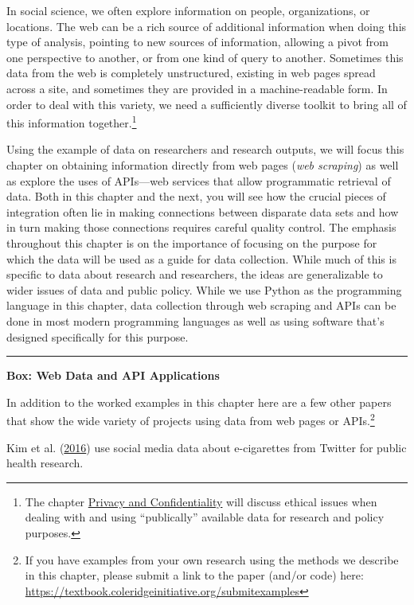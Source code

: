 \documentclass[]{krantz}
\begin{document}
In social science, we often explore information on people,
organizations, or locations. The web can be a rich source of additional
information when doing this type of analysis, pointing to new sources of
information, allowing a pivot from one perspective to another, or from
one kind of query to another. Sometimes this data from the web is
completely unstructured, existing in web pages spread across a site, and
sometimes they are provided in a machine-readable form. In order to deal
with this variety, we need a sufficiently diverse toolkit to bring all
of this information together.\footnote{The chapter
  \protect\hyperlink{chap:privacy}{Privacy and Confidentiality} will
  discuss ethical issues when dealing with and using ``publically''
  available data for research and policy purposes.}

Using the example of data on researchers and research outputs, we will
focus this chapter on obtaining information directly from web pages
(\emph{web scraping}) as well as explore the uses of APIs---web services
that allow programmatic retrieval of data. Both in this chapter and the
next, you will see how the crucial pieces of integration often lie in
making connections between disparate data sets and how in turn making
those connections requires careful quality control. The emphasis
throughout this chapter is on the importance of focusing on the purpose
for which the data will be used as a guide for data collection. While
much of this is specific to data about research and researchers, the
ideas are generalizable to wider issues of data and public policy. While
we use Python as the programming language in this chapter, data
collection through web scraping and APIs can be done in most modern
programming languages as well as using software that's designed
specifically for this purpose.

\begin{center}\rule{0.5\linewidth}{\linethickness}\end{center}

\textbf{Box: Web Data and API Applications}

In addition to the worked examples in this chapter here are a few other
papers that show the wide variety of projects using data from web pages
or APIs.\footnote{If you have examples from your own research using the
  methods we describe in this chapter, please submit a link to the paper
  (and/or code) here:
  \url{https://textbook.coleridgeinitiative.org/submitexamples}}

Kim et al. (\protect\hyperlink{ref-Kim2016}{2016}) use social media data
about e-cigarettes from Twitter for public health research.
\end{document}
